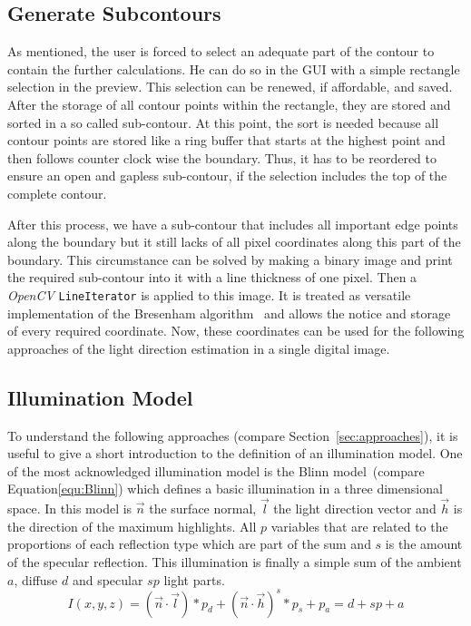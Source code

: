 \subsection{Generate Subcontours}\label{sec:subcontours}
As mentioned, the user is forced to select an adequate part of the contour to contain the further calculations. He can do so in the GUI with a simple rectangle selection in the preview. This selection can be renewed, if affordable, and saved. After the storage of all contour points within the rectangle, they are stored and sorted in a so called  sub-contour. At this point, the sort is needed because all contour points are stored like a ring buffer that starts at the highest point and then follows counter clock wise the boundary. Thus, it has to be reordered to ensure an open and gapless sub-contour, if the selection includes the top of the complete contour.

After this process, we have a sub-contour that includes all important edge points along the boundary but it still lacks of all pixel coordinates along this part of the boundary.
This circumstance can be solved by making a binary image and print the required sub-contour into it with a line thickness of one pixel. Then a \textit{OpenCV} \texttt{LineIterator} is applied to this image. It is treated as versatile implementation of the Bresenham algorithm~\cite{5388473} and allows the notice and storage of every required coordinate. Now, these coordinates can be used for the following approaches of the light direction estimation in a single digital image.


\subsection{Illumination Model}\label{sec:lightingmodel}
To understand the following approaches (compare Section~\ref{sec:approaches}), it is useful to give a short introduction to the definition of an illumination model. One of the most acknowledged illumination model is the Blinn model~\cite{Blinn:1977}(compare Equation\ref{equ:Blinn}) which defines a basic illumination in a three dimensional space. In this model is $\vec{n}$ the surface normal, $\vec{l}$ the light direction vector and $\vec{h}$ is the direction of the maximum highlights. All $p$ variables that are related to the proportions of each reflection type which are part of the sum and $s$ is the amount of the specular reflection. This illumination is finally a simple sum of the ambient $a$, diffuse $d$ and specular $sp$ light parts. 
\begin{equation}
\label{equ:Blinn}
I(x,y,z) = (\vec{n}\cdot \vec{l})*p_d + (\vec{n}\cdot\vec{h})^s*p_s + p_a = d + sp + a
\end{equation} 

